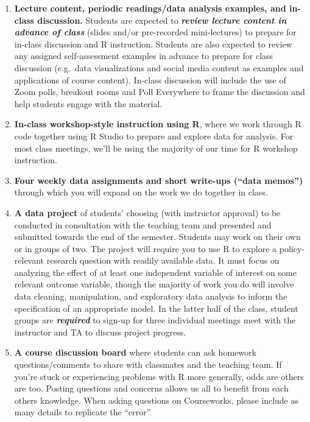 \documentclass[11pt,]{article}
\begin{document}
\begin{enumerate}
\def\labelenumi{\arabic{enumi}.}
\item
  \textbf{Lecture content, periodic readings/data analysis examples, and
  in-class discussion.} Students are expected to \emph{\textbf{review
  lecture content in advance of class}} (slides and/or pre-recorded
  mini-lectures) to prepare for in-class discussion and R instruction.
  Students are also expected to review any assigned self-assessment
  examples in advance to prepare for class discussion (e.g.~data
  visualizations and social media content as examples and applications
  of course content). In-class discussion will include the use of Zoom
  polls, breakout rooms and Poll Everywhere to frame the discussion and
  help students engage with the material.
\item
  \textbf{In-class workshop-style instruction using R}, where we work
  through R code together using R Studio to prepare and explore data for
  analysis. For most class meetings, we'll be using the majority of our
  time for R workshop instruction.
\item
  \textbf{Four weekly data assignments and short write-ups (``data
  memos'')} through which you will expand on the work we do together in
  class.
\item
  \textbf{A data project} of students' choosing (with instructor
  approval) to be conducted in consultation with the teaching team and
  presented and submitted towards the end of the semester. Students may
  work on their own or in groups of two. The project will require you to
  use R to explore a policy-relevant research question with readily
  available data. It must focus on analyzing the effect of at least one
  independent variable of interest on some relevant outcome variable,
  though the majority of work you do will involve data cleaning,
  manipulation, and exploratory data analysis to inform the
  specification of an appropriate model. In the latter half of the
  class, student groups are \emph{\textbf{required}} to sign-up for
  three individual meetings meet with the instructor and TA to discuss
  project progress.
\item
  \textbf{A course discussion board} where students can ask homework
  questions/comments to share with classmates and the teaching team. If
  you're stuck or experiencing problems with R more generally, odds are
  others are too. Posting questions and concerns allows us all to
  benefit from each others knowledge. When asking questions on
  Courseworks, please include as many details to replicate the ``error''

\end{enumerate}
\end{document}
